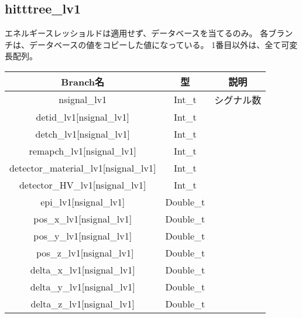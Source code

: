 \documentclass[10.5pt]{jsarticle}
\begin{document}
\subsection{hitttree\_lv1}
エネルギースレッショルドは適用せず、データベースを当てるのみ。
各ブランチは、データベースの値をコピーした値になっている。
1番目以外は、全て可変長配列。
\begin{table}[htb]
  \begin{tabular}{|c|c|c|} \hline
  Branch名 & 型 & 説明 \\ \hline
 nsignal\_lv1 &  Int\_t & シグナル数\\ 
detid\_lv1[nsignal\_lv1] &  Int\_t & \\ 
detch\_lv1[nsignal\_lv1] &   Int\_t & \\ 
remapch\_lv1[nsignal\_lv1] &  Int\_t & \\ 
detector\_material\_lv1[nsignal\_lv1] & Int\_t & \\ 
detector\_HV\_lv1[nsignal\_lv1]  & Int\_t & \\
epi\_lv1[nsignal\_lv1]    & Double\_t & \\     
pos\_x\_lv1[nsignal\_lv1]   & Double\_t & \\ 
pos\_y\_lv1[nsignal\_lv1]   & Double\_t & \\ \
pos\_z\_lv1[nsignal\_lv1]   & Double\_t & \\ 
delta\_x\_lv1[nsignal\_lv1] & Double\_t & \\ 
delta\_y\_lv1[nsignal\_lv1]  & Double\_t & \\ 
delta\_z\_lv1[nsignal\_lv1]  & Double\_t & \\ \hline
  \end{tabular}
\end{table}
\end{document}
